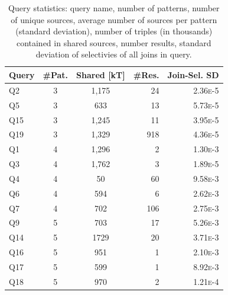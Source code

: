 \begin{table}[htb]
  \centering
  \begin{tabular}{l|c|c|r|r}
    Query & \#Pat. & Shared [kT] & \#Res. & Join-Sel. SD \\ 
    \hline

    Q2  & 3 & 1,175 & 24  & 2.36\textsc{e}-5 \\
    Q5  & 3 & 633   & 13  & 5.73\textsc{e}-5 \\
    Q15 & 3 & 1,245 & 11  & 3.95\textsc{e}-5 \\
    Q19 & 3 & 1,329 & 918 & 4.36\textsc{e}-5 \\
    \hline
    Q1  & 4 & 1,296 & 2   & 1.30\textsc{e}-3 \\
    Q3  & 4 & 1,762 & 3   & 1.89\textsc{e}-5 \\
    Q4  & 4 & 50    & 60  & 9.58\textsc{e}-3 \\
    Q6  & 4 & 594   & 6   & 2.62\textsc{e}-3 \\
    Q7  & 4 & 702   & 106 & 2.75\textsc{e}-3 \\
    \hline
    Q9  & 5 & 703   & 17  & 5.26\textsc{e}-3 \\
    Q14 & 5 & 1729  & 20  & 3.71\textsc{e}-3 \\
    Q16 & 5 & 951   & 1   & 2.10\textsc{e}-3 \\
    Q17 & 5 & 599   & 1   & 8.92\textsc{e}-3 \\
    Q18 & 5 & 970   & 2   & 1.21\textsc{e}-4 \\
  \end{tabular}
  \caption{Query statistics: query name, number of patterns, number of unique sources, average number of sources per pattern (standard deviation), number of triples (in thousands) contained in shared sources, number results, standard deviation of selectivies of all joins in query.}
  \label{tab:queries}
\end{table}

